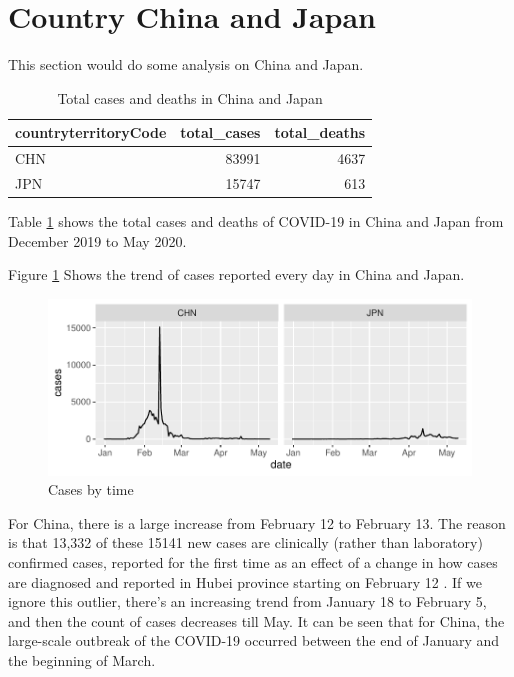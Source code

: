 \documentclass[11pt,a4paper,]{article}
\begin{document}
\clearpage

\section*{Country China and Japan}

This section would do some analysis on China and Japan.

\begin{table}

\caption{\label{tab:tab1}Total cases and deaths in China and Japan}
\centering
\begin{tabular}[t]{l|r|r}
\hline
countryterritoryCode & total\_cases & total\_deaths\\
\hline
CHN & 83991 & 4637\\
\hline
JPN & 15747 & 613\\
\hline
\end{tabular}
\end{table}

Table \ref{tab:tab1} shows the total cases and deaths of COVID-19 in China and Japan from December 2019 to May 2020.

Figure \ref{fig:fig1} Shows the trend of cases reported every day in China and Japan.

\begin{figure}

{\centering \includegraphics{report_files/figure-latex/fig1-1} 

}

\caption{Cases by time}\label{fig:fig1}
\end{figure}

For China, there is a large increase from February 12 to February 13. The reason is that 13,332 of these 15141 new cases are clinically (rather than laboratory) confirmed cases, reported for the first time as an effect of a change in how cases are diagnosed and reported in Hubei province starting on February 12 \autocite{time}. If we ignore this outlier, there's an increasing trend from January 18 to February 5, and then the count of cases decreases till May. It can be seen that for China, the large-scale outbreak of the COVID-19 occurred between the end of January and the beginning of March.
\end{document}

